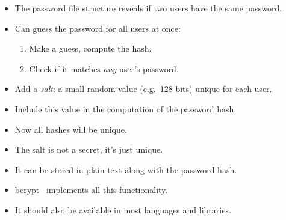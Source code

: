 \begin{frame}
  \begin{remark}
    \begin{itemize}
      \item The password file structure reveals if two users have the same 
        password.
      \item Can guess the password for all users at once:
        \begin{enumerate}
          \item Make a guess, compute the hash.
          \item Check if it matches \emph{any} user's password.
        \end{enumerate}
    \end{itemize}
  \end{remark}

  \pause{}

  \begin{solution}
    \begin{itemize}
      \item Add a \emph{salt}: a small random value (e.g.\ 128 bits) unique for 
        each user.
      \item Include this value in the computation of the password hash.
      \item Now all hashes will be unique.
    \end{itemize}
  \end{solution}
\end{frame}

\begin{frame}
  \begin{remark}
    \begin{itemize}
      \item The salt is not a secret, it's just unique.
      \item It can be stored in plain text along with the password hash.
    \end{itemize}
  \end{remark}
\end{frame}

\begin{frame}
  \begin{example}
    \begin{itemize}
      \item bcrypt~\cite{bcrypt} implements all this functionality.
      \item It should also be available in most languages and libraries.
    \end{itemize}
  \end{example}
\end{frame}

